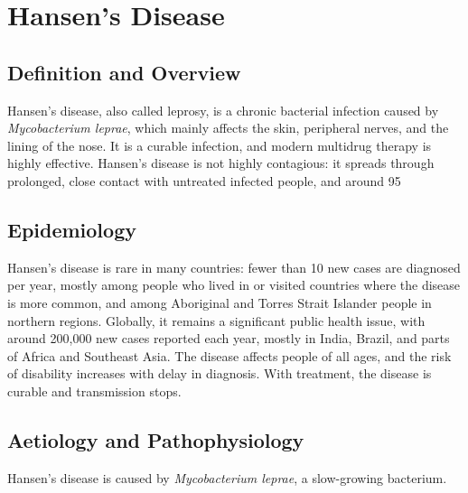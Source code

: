 \chapter{Hansen's Disease}

\section*{Definition and Overview}
Hansen's disease, also called leprosy, is a chronic bacterial infection caused by \textit{Mycobacterium leprae}, which mainly affects the skin, peripheral nerves, and the lining of the nose. It is a curable infection, and modern multidrug therapy is highly effective. Hansen's disease is not highly contagious: it spreads through prolonged, close contact with untreated infected people, and around 95%

\section*{Epidemiology}
Hansen's disease is rare in many countries: fewer than 10 new cases are diagnosed per year, mostly among people who lived in or visited countries where the disease is more common, and among Aboriginal and Torres Strait Islander people in northern regions. Globally, it remains a significant public health issue, with around 200,000 new cases reported each year, mostly in India, Brazil, and parts of Africa and Southeast Asia. The disease affects people of all ages, and the risk of disability increases with delay in diagnosis. With treatment, the disease is curable and transmission stops.

\section*{Aetiology and Pathophysiology}
Hansen's disease is caused by \textit{Mycobacterium leprae}, a slow-growing bacterium.

